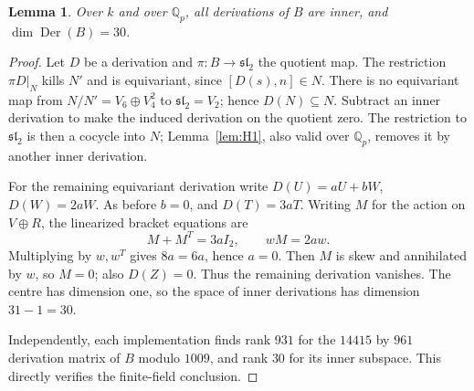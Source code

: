 \documentclass[11pt]{article}
\newtheorem{lemma}[theorem]{Lemma}
\theoremstyle{definition}\newtheorem{definition}[theorem]{Definition}
\theoremstyle{remark}\newtheorem{remark}[theorem]{Remark}
\DeclareMathOperator{\Der}{Der}
\newcommand{\Qp}{\mathbb Q_p}
\begin{document}
\begin{lemma}\label{lem:der}
Over $k$ and over $\Qp$, all derivations of $B$ are inner, and
$\dim\Der(B)=30$.
\end{lemma}
\begin{proof}
Let $D$ be a derivation and $\pi:B\to\mathfrak{sl}_2$ the quotient map.
The restriction $\pi D|_N$ kills $N'$ and is equivariant, since
$[D(s),n]\in N$. There is no equivariant map from
$N/N'=V_6\oplus V_4^2$ to $\mathfrak{sl}_2=V_2$; hence $D(N)\subseteq N$.
Subtract an inner derivation to make the induced derivation on the quotient
zero. The restriction to $\mathfrak{sl}_2$ is then a cocycle into $N$;
Lemma~\ref{lem:H1}, also valid over $\Qp$, removes it by another inner derivation.

For the remaining equivariant derivation write
$D(U)=aU+bW$, $D(W)=2aW$. As before $b=0$, and $D(T)=3aT$.
Writing $M$ for the action on $V\oplus R$, the linearized bracket equations are
\[
 M+M^T=3aI_2,\qquad wM=2aw.
\]
Multiplying by $w,w^T$ gives $8a=6a$, hence $a=0$.
Then $M$ is skew and annihilated by $w$, so $M=0$; also $D(Z)=0$.
Thus the remaining derivation vanishes. The centre has dimension one,
so the space of inner derivations has dimension $31-1=30$.

Independently, each implementation finds rank $931$ for the $14415$ by $961$
derivation matrix of $B$ modulo $1009$, and rank $30$ for its inner
subspace. This directly verifies the finite-field conclusion.
\end{proof}
\end{document}
